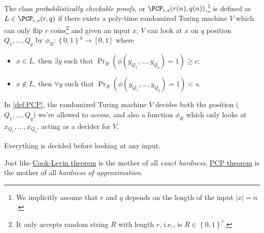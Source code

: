 \begin{definition}[\(\PCP\)]\label{def:PCP}
	The class \emph{probabilistically checkable proofs}, or \(\PCP_{c, s}(r(n), q(n))\),\footnote{We implicitly assume that \(r\) and \(q\) depends on the length of the input \(\vert x \vert = n\).} is defined as \(L\in \PCP_{c, s}(r, q)\) if there exists a poly-time randomized Turing machine \(V\) which can only flip \(r\) coins\footnote{It only accepts random string \(R\) with length \(r\), i.e., is \(R \in \left\{ 0, 1 \right\} ^r\).} and given an input \(x\), \(V\) can look at \(x\) on \(q\) position \(Q_1, \ldots  , Q_q\) by \(\phi _R\colon \left\{ 0, 1 \right\} ^q \to \left[ 0, 1 \right] \) where
	\begin{itemize}
		\item \(x\in L\), then \(\exists y\) such that \(\Pr_{R}(\phi (y_{Q_1}, \ldots , y_{Q_q} ) = 1) \geq c\);
		\item \(x\notin L\), then \(\forall y\) such that \(\Pr_{R}(\phi (y_{Q_1}, \ldots , y_{Q_q} ) = 1) < s\).
	\end{itemize}
\end{definition}

In \autoref{def:PCP}, the randomized Turing machine \(V\) decides both the position (\(Q_1, \ldots , Q_q \)) we're allowed to access, and also a function \(\phi _R\) which only looks at \(x_{Q_1}, \ldots , x_{Q_q}\), acting as a decider for \(V\).

\begin{note}
	Everything is decided before looking at any input.
\end{note}

Just like \hyperref[thm:Cook-Levin]{Cook-Levin theorem} is the mother of all \emph{exact hardness}, \hyperref[thm:PCP]{PCP theorem} is the mother of all \emph{hardness of approximation}.